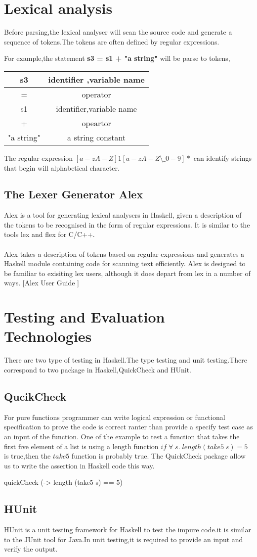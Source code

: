 \section {Lexical analysis}
Before parsing,the lexical analyser will scan the source code and generate a sequence of tokens.The tokens are often defined by regular expressions.

For example,the statement \textbf{s3 = s1 + "a string"} will be parse to tokens,

\begin{tabular}{|c|c|}
\hline s3 & identifier ,variable name \\ 
\hline = & operator \\ 
\hline s1 & identifier,variable name \\ 
\hline + & opeartor \\ 
\hline "a string" & a string constant \\ 
\hline 
\end{tabular} 

The regular expression $ [a-zA-Z]{1}[a-zA-Z\setminus\_0-9]*  $ can identify strings that begin will alphabetical character.


\subsection{The Lexer Generator Alex}
Alex is a tool for generating lexical analysers in Haskell, given a description of the tokens to be recognised in the form of regular expressions. It is similar to the tools lex and flex for C/C++.
\\\\
Alex takes a description of tokens based on regular expressions and generates a Haskell module containing code for scanning text efficiently. Alex is designed to be familiar to exisiting lex users, although it does depart from lex in a number of ways.
[Alex User Guide  ]

\section{Testing and Evaluation Technologies}
There are two type of testing in Haskell.The type testing and unit testing.There correspond to two package in Haskell,QuickCheck and HUnit.
\subsection*{QucikCheck}
For pure functions programmer can write logical expression or functional specification to prove the code is correct ranter than provide a specify test case as an input of the function.
One of the example to test a function that takes the first five element of a list is using a length function $ if \;\forall \;s.\; length(take5 \;s) = 5 \;$ is true,then the $take5$ function is probably true.
The QuickCheck package allow us to write the assertion in Haskell code this way.
\begin{hcode}
quickCheck (\s -> length (take5 s) == 5)
\end{hcode}

\subsection*{HUnit}
HUnit is a unit testing framework for Haskell to test the impure code.it is similar to the JUnit tool for Java.In unit testing,it is required to provide an input and verify the output.




